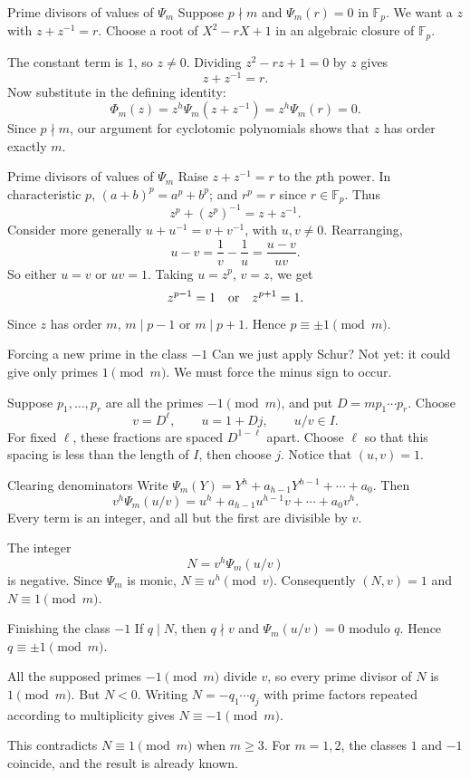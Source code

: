 \documentclass[aspectratio=169,11pt]{beamer}
\newcommand{\F}{\mathbb F}
\begin{document}
\begin{frame}{Prime divisors of values of $\Psi_m$}
Suppose $p\nmid m$ and $\Psi_m(r)=0$ in $\F_p$. We want a $z$ with $z+z^{-1}=r$. Choose a root of $X^2-rX+1$ in an algebraic closure of $\F_p$.

The constant term is $1$, so $z\ne0$. Dividing $z^2-rz+1=0$ by $z$ gives
\[z+z^{-1}=r.\]
Now substitute in the defining identity:
\[\Phi_m(z)=z^h\Psi_m(z+z^{-1})=z^h\Psi_m(r)=0.\]
Since $p\nmid m$, our argument for cyclotomic polynomials shows that $z$ has order exactly $m$.
\end{frame}
\begin{frame}{Prime divisors of values of $\Psi_m$}
Raise $z+z^{-1}=r$ to the $p$th power. In characteristic $p$, $(a+b)^p=a^p+b^p$; and $r^p=r$ since $r\in\F_p$. Thus
\[z^p+(z^p)^{-1}=z+z^{-1}.\]
Consider more generally $u+u^{-1}=v+v^{-1}$, with $u,v\ne0$. Rearranging,
\[u-v=\frac1v-\frac1u=\frac{u-v}{uv}.\]
So either $u=v$ or $uv=1$. Taking $u=z^p$, $v=z$, we get
\[z^{p-1}=1\quad\hbox{or}\quad z^{p+1}=1.\]
Since $z$ has order $m$, $m\mid p-1$ or $m\mid p+1$. Hence $p\equiv\pm1\pmod m$.
\end{frame}
\begin{frame}{Forcing a new prime in the class $-1$}
Can we just apply Schur? Not yet: it could give only primes $1\pmod m$. We must force the minus sign to occur.

Suppose $p_1,\ldots,p_r$ are all the primes $-1\pmod m$, and put $D=mp_1\cdots p_r$. Choose
\[v=D^\ell,\qquad u=1+Dj,\qquad u/v\in I.\]
For fixed $\ell$, these fractions are spaced $D^{1-\ell}$ apart. Choose $\ell$ so that this spacing is less than the length of $I$, then choose $j$. Notice that $(u,v)=1$.
\end{frame}
\begin{frame}{Clearing denominators}
Write $\Psi_m(Y)=Y^h+a_{h-1}Y^{h-1}+\cdots+a_0$. Then
\[v^h\Psi_m(u/v)=u^h+a_{h-1}u^{h-1}v+\cdots+a_0v^h.\]
Every term is an integer, and all but the first are divisible by $v$.

The integer
\[N=v^h\Psi_m(u/v)\]
is negative. Since $\Psi_m$ is monic, $N\equiv u^h\pmod v$. Consequently $(N,v)=1$ and $N\equiv1\pmod m$.
\end{frame}
\begin{frame}{Finishing the class $-1$}
If $q\mid N$, then $q\nmid v$ and $\Psi_m(u/v)=0$ modulo $q$. Hence $q\equiv\pm1\pmod m$.

All the supposed primes $-1\pmod m$ divide $v$, so every prime divisor of $N$ is $1\pmod m$. But $N<0$. Writing $N=-q_1\cdots q_j$ with prime factors repeated according to multiplicity gives $N\equiv-1\pmod m$.

This contradicts $N\equiv1\pmod m$ when $m\ge3$. For $m=1,2$, the classes $1$ and $-1$ coincide, and the result is already known.
\end{frame}
\end{document}
